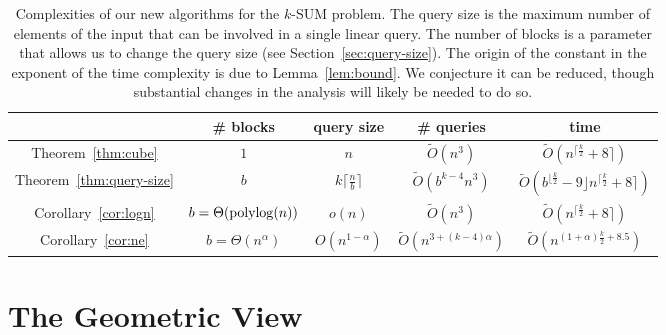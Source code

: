 \begin{table}
\centering
\caption{Complexities of our new algorithms for the \(k\)-SUM problem. The query
size is the maximum number of elements of the input that can be involved in a
single linear query. The number of blocks is a parameter that allows us to
change the query size (see Section~\ref{sec:query-size}).
The origin of the constant in the exponent of the time complexity is due to
Lemma~\ref{lem:bound}. We conjecture it can be reduced, though substantial
changes in the analysis will likely be needed to do so.}
\label{tab:results}
\begin{tabular}{|c|c|c|c|c|}
	\hline

	& \# blocks & query size & \# queries & time \\
	\hline
	Theorem~\ref{thm:cube} &
	$1$ &
	$n$ &
	$\tilde{O}(n^3)$ & $\tilde{O}(n^{\lceil\frac{k}{2}}+8\rceil)$
	\\

	\hline

	Theorem~\ref{thm:query-size} &
	$b$ &
	$k\lceil\frac{n}{b}\rceil$ &
	$\tilde{O}(b^{k-4}n^3)$ &
	$\tilde{O}(b^{\lfloor\frac{k}{2}}-9\rfloor n^{\lceil\frac{k}{2}}+8\rceil)$
	\\

	\hline

	Corollary~\ref{cor:logn} &
	$b=\Theta(\operatorname{polylog}(n))$ &
	$o(n)$ &
	$\tilde{O}(n^3)$ &
	$\tilde{O}(n^{\lceil\frac{k}{2}}+8\rceil)$
	\\

	\hline

	Corollary~\ref{cor:ne} &
	$b=\Theta(n^\alpha)$ &
	$O(n^{1-\alpha})$ &
	$\tilde{O}(n^{3+(k-4)\alpha})$ &
	$\tilde{O}(n^{(1+\alpha)\frac{k}{2} +8.5})$
	\\

	\hline
\end{tabular}
\end{table}

\section{The Geometric View}
